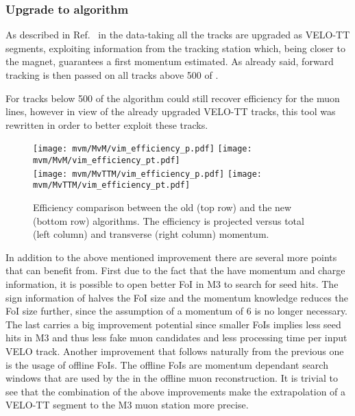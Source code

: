 \subsubsection{Upgrade to \mvTTm algorithm}
\label{sec:matchvelottmuon}

As described in Ref.~\cite{LHCb-PUB-2015-005} in the \runtwo data-taking all the tracks are upgraded as VELO-TT segments, 
exploiting information from the \ttracker tracking station which, being closer to the magnet, 
guarantees a first momentum estimated. As already said, forward tracking is then passed on 
all tracks above 500 \mevc of \pt.

For tracks below 500 \mevc of \pt the \mvm algorithm could still recover efficiency for the muon lines, 
however in view of the already upgraded VELO-TT tracks, this tool was rewritten in order to better exploit these tracks.

\begin{figure}[!h]
 \centering
 \texttt{[image: mvm/MvM/vim\_efficiency\_p.pdf]}
 \texttt{[image: mvm/MvM/vim\_efficiency\_pt.pdf]}\\
 \texttt{[image: mvm/MvTTM/vim\_efficiency\_p.pdf]}
 \texttt{[image: mvm/MvTTM/vim\_efficiency\_pt.pdf]}

 \caption{ Efficiency comparison between the old \mvm (top row) and the new \mvTTm (bottom row) algorithms.
 The efficiency is projected versus total (left column) and transverse (right column) momentum.  }
 \label{fig:mvm_eff}
\end{figure}

In addition to the above mentioned improvement there are several more points that \mvm can benefit from. 
First due to the fact that the \veloTTCand have momentum and charge information, it is possible to open better 
FoI in M3 to search for seed hits. The sign information of \veloTTCand halves the FoI size
and the momentum knowledge reduces the FoI size further, since the assumption of a momentum of 6 \mev 
is no longer necessary. The last carries a big improvement potential
since smaller FoIs implies less seed hits in M3 and thus less fake muon candidates and less processing time per input VELO track.
Another improvement that follows naturally from the previous one is the usage of offline FoIs. 
The offline FoIs are momentum dependant search windows that are used 
by the \muonID in the offline muon reconstruction. It is trivial to see that the combination of the above improvements 
make the extrapolation of a VELO-TT segment to the M3 muon station more precise.


